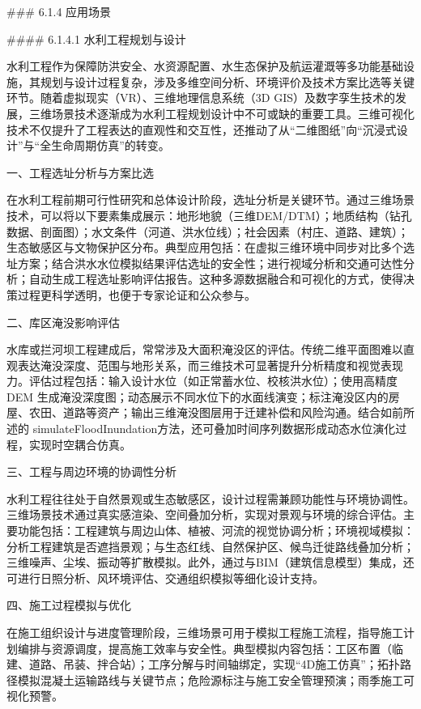 \#\#\# 6.1.4 应用场景

\#\#\#\# 6.1.4.1 水利工程规划与设计

水利工程作为保障防洪安全、水资源配置、水生态保护及航运灌溉等多功能基础设施，其规划与设计过程复杂，涉及多维空间分析、环境评价及技术方案比选等关键环节。随着虚拟现实（VR）、三维地理信息系统（3D GIS）及数字孪生技术的发展，三维场景技术逐渐成为水利工程规划设计中不可或缺的重要工具。三维可视化技术不仅提升了工程表达的直观性和交互性，还推动了从``二维图纸''向``沉浸式设计''与``全生命周期仿真''的转变。

一、工程选址分析与方案比选

在水利工程前期可行性研究和总体设计阶段，选址分析是关键环节。通过三维场景技术，可以将以下要素集成展示：地形地貌（三维DEM/DTM）；地质结构（钻孔数据、剖面图）；水文条件（河道、洪水位线）；社会因素（村庄、道路、建筑）；生态敏感区与文物保护区分布。典型应用包括：在虚拟三维环境中同步对比多个选址方案；结合洪水水位模拟结果评估选址的安全性；进行视域分析和交通可达性分析；自动生成工程选址影响评估报告。这种多源数据融合和可视化的方式，使得决策过程更科学透明，也便于专家论证和公众参与。

二、库区淹没影响评估

水库或拦河坝工程建成后，常常涉及大面积淹没区的评估。传统二维平面图难以直观表达淹没深度、范围与地形关系，而三维技术可显著提升分析精度和视觉表现力。评估过程包括：输入设计水位（如正常蓄水位、校核洪水位）；使用高精度 DEM 生成淹没深度图；动态展示不同水位下的水面线演变；标注淹没区内的房屋、农田、道路等资产；输出三维淹没图层用于迁建补偿和风险沟通。结合如前所述的 simulateFloodInundation方法，还可叠加时间序列数据形成动态水位演化过程，实现时空耦合仿真。

三、工程与周边环境的协调性分析

水利工程往往处于自然景观或生态敏感区，设计过程需兼顾功能性与环境协调性。三维场景技术通过真实感渲染、空间叠加分析，实现对景观与环境的综合评估。主要功能包括：工程建筑与周边山体、植被、河流的视觉协调分析；环境视域模拟：分析工程建筑是否遮挡景观；与生态红线、自然保护区、候鸟迁徙路线叠加分析；三维噪声、尘埃、振动等扩散模拟。此外，通过与BIM（建筑信息模型）集成，还可进行日照分析、风环境评估、交通组织模拟等细化设计支持。

四、施工过程模拟与优化

在施工组织设计与进度管理阶段，三维场景可用于模拟工程施工流程，指导施工计划编排与资源调度，提高施工效率与安全性。典型模拟内容包括：工区布置（临建、道路、吊装、拌合站）；工序分解与时间轴绑定，实现``4D施工仿真''；拓扑路径模拟混凝土运输路线与关键节点；危险源标注与施工安全管理预演；雨季施工可视化预警。

